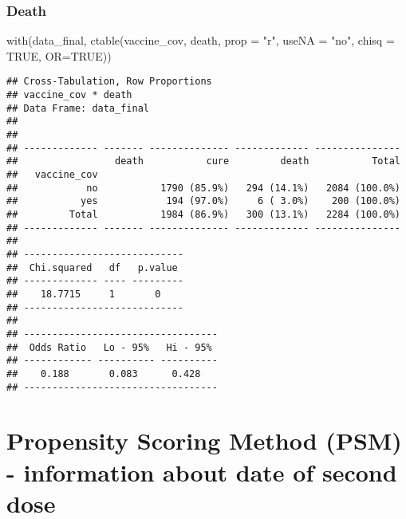 \documentclass[
]{article}
\newenvironment{Shaded}{\begin{snugshade}}{\end{snugshade}}
\newcommand{\AttributeTok}[1]{\textcolor[rgb]{0.77,0.63,0.00}{#1}}
\newcommand{\ConstantTok}[1]{\textcolor[rgb]{0.00,0.00,0.00}{#1}}
\newcommand{\FunctionTok}[1]{\textcolor[rgb]{0.00,0.00,0.00}{#1}}
\newcommand{\NormalTok}[1]{#1}
\newcommand{\StringTok}[1]{\textcolor[rgb]{0.31,0.60,0.02}{#1}}
\begin{document}
\hypertarget{death}{%
\subsubsection{Death}\label{death}}

\begin{Shaded}
\begin{Highlighting}[]
\FunctionTok{with}\NormalTok{(data\_final, }\FunctionTok{ctable}\NormalTok{(vaccine\_cov, death, }\AttributeTok{prop =} \StringTok{"r"}\NormalTok{, }\AttributeTok{useNA =} \StringTok{"no"}\NormalTok{, }\AttributeTok{chisq =} \ConstantTok{TRUE}\NormalTok{, }\AttributeTok{OR=}\ConstantTok{TRUE}\NormalTok{))}
\end{Highlighting}
\end{Shaded}

\begin{verbatim}
## Cross-Tabulation, Row Proportions  
## vaccine_cov * death  
## Data Frame: data_final  
## 
## 
## ------------- ------- -------------- ------------- ---------------
##                 death           cure         death           Total
##   vaccine_cov                                                     
##            no           1790 (85.9%)   294 (14.1%)   2084 (100.0%)
##           yes            194 (97.0%)     6 ( 3.0%)    200 (100.0%)
##         Total           1984 (86.9%)   300 (13.1%)   2284 (100.0%)
## ------------- ------- -------------- ------------- ---------------
## 
## ----------------------------
##  Chi.squared   df   p.value 
## ------------- ---- ---------
##    18.7715     1       0    
## ----------------------------
## 
## ----------------------------------
##  Odds Ratio   Lo - 95%   Hi - 95% 
## ------------ ---------- ----------
##    0.188       0.083      0.428   
## ----------------------------------
\end{verbatim}

\hypertarget{propensity-scoring-method-psm---information-about-date-of-second-dose}{%
\section{Propensity Scoring Method (PSM) - information about date of
second
dose}\label{propensity-scoring-method-psm---information-about-date-of-second-dose}}
\end{document}
